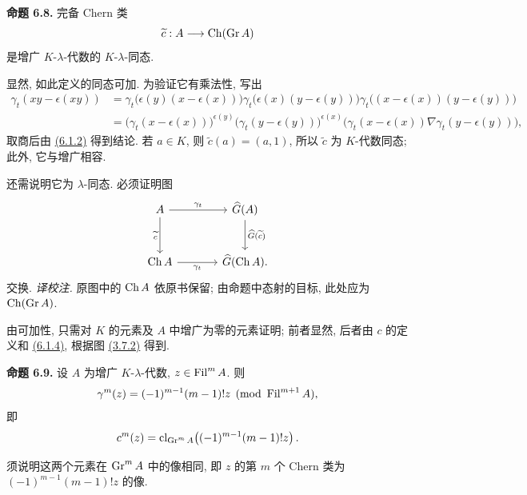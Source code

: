 \textbf{命题 6.8.} 完备 Chern 类
\[
  \widetilde c:A\longrightarrow\operatorname{Ch}(\operatorname{Gr} A)
\]
是增广 \(K\)-\(\lambda\)-代数的 \(K\)-\(\lambda\)-同态.

显然, 如此定义的同态可加. 为验证它有乘法性, 写出
\[
\begin{aligned}
\gamma_t(xy-\epsilon(xy))
&=\gamma_t\bigl(\epsilon(y)(x-\epsilon(x))\bigr)
  \gamma_t\bigl(\epsilon(x)(y-\epsilon(y))\bigr)
  \gamma_t\bigl((x-\epsilon(x))(y-\epsilon(y))\bigr)\\
&=\bigl(\gamma_t(x-\epsilon(x))\bigr)^{\epsilon(y)}
  \bigl(\gamma_t(y-\epsilon(y))\bigr)^{\epsilon(x)}
  \bigl(\gamma_t(x-\epsilon(x))\nabla\gamma_t(y-\epsilon(y))\bigr),
\end{aligned}
\]
取商后由 \hyperlink{sga6.e05.eq.6-1-2}{(6.1.2)} 得到结论. 若 \(a\in K\), 则 \(\widetilde c(a)=(a,1)\), 所以 \(\widetilde c\) 为 \(K\)-代数同态; 此外, 它与增广相容.

还需说明它为 \(\lambda\)-同态. 必须证明图
\[
\begin{tikzcd}[column sep=large,row sep=large]
A \arrow[r,"\gamma_t"] \arrow[d,"\widetilde c"'] &
\Ghat(A) \arrow[d,"\Ghat(\widetilde c)"]\\
\Ch A \arrow[r,"\gamma_t"'] &
\Ghat(\Ch A).
\end{tikzcd}
\]
交换. \emph{译校注.} 原图中的 \(\operatorname{Ch} A\) 依原书保留; 由命题中态射的目标, 此处应为 \(\operatorname{Ch}(\operatorname{Gr} A)\).

由可加性, 只需对 \(K\) 的元素及 \(A\) 中增广为零的元素证明; 前者显然, 后者由 \(c\) 的定义和 \hyperlink{sga6.e05.eq.6-1-4}{(6.1.4)}, 根据图 \hyperlink{sga6.e05.eq.3-7-2}{(3.7.2)} 得到.

\textbf{命题 6.9.} 设 \(A\) 为增广 \(K\)-\(\lambda\)-代数, \(z\in\operatorname{Fil}^mA\). 则
\[
  \gamma^m(z)=(-1)^{m-1}(m-1)!z\pmod{\operatorname{Fil}^{m+1}A},
\]
即
\[
  c^m(z)=\operatorname{cl}_{\operatorname{Gr}^mA}\!\left((-1)^{m-1}(m-1)!z\right).
\]

须说明这两个元素在 \(\operatorname{Gr}^mA\) 中的像相同, 即 \(z\) 的第 \(m\) 个 Chern 类为 \((-1)^{m-1}(m-1)!z\) 的像.

